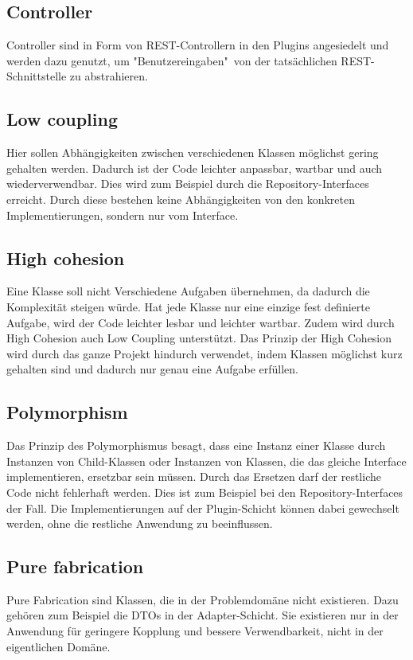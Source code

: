     \subsection{Controller}
    Controller sind in Form von REST-Controllern in den Plugins angesiedelt und werden dazu genutzt, um "Benutzereingaben"\ von der tatsächlichen REST-Schnittstelle zu abstrahieren.
    
    \subsection{Low coupling}
    Hier sollen Abhängigkeiten zwischen verschiedenen Klassen möglichst gering gehalten werden. Dadurch ist der Code leichter anpassbar, wartbar und auch wiederverwendbar. Dies wird zum Beispiel durch die Repository-Interfaces erreicht. Durch diese bestehen keine Abhängigkeiten von den konkreten Implementierungen, sondern nur vom Interface.
    
    \subsection{High cohesion}
    Eine Klasse soll nicht Verschiedene Aufgaben übernehmen, da dadurch die Komplexität steigen würde. Hat jede Klasse nur eine einzige fest definierte Aufgabe, wird der Code leichter lesbar und leichter wartbar. Zudem wird durch High Cohesion auch Low Coupling unterstützt. Das Prinzip der High Cohesion wird durch das ganze Projekt hindurch verwendet, indem Klassen möglichst kurz gehalten sind und dadurch nur genau eine Aufgabe erfüllen.
    
    \subsection{Polymorphism}
    Das Prinzip des Polymorphismus besagt, dass eine Instanz einer Klasse durch Instanzen von Child-Klassen oder Instanzen von Klassen, die das gleiche Interface implementieren, ersetzbar sein müssen. Durch das Ersetzen darf der restliche Code nicht fehlerhaft werden. Dies ist zum Beispiel bei den Repository-Interfaces der Fall. Die Implementierungen auf der Plugin-Schicht können dabei gewechselt werden, ohne die restliche Anwendung zu beeinflussen.
    
    \subsection{Pure fabrication}
    Pure Fabrication sind Klassen, die in der Problemdomäne nicht existieren. Dazu gehören zum Beispiel die DTOs in der Adapter-Schicht. Sie existieren nur in der Anwendung für geringere Kopplung und bessere Verwendbarkeit, nicht in der eigentlichen Domäne.
    
